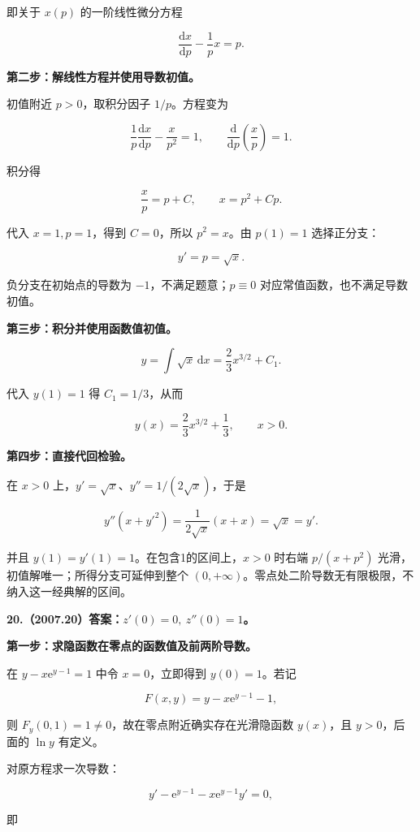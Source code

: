 \documentclass[UTF8,11pt,fontset=windows]{ctexart}
\begin{document}
即关于 $x(p)$ 的一阶线性微分方程

$$
\frac{\mathrm dx}{\mathrm dp}-\frac1p x=p.
$$

\textbf{第二步：解线性方程并使用导数初值。}

初值附近 $p>0$，取积分因子 $1/p$。方程变为

$$
\frac1p\frac{\mathrm dx}{\mathrm dp}-\frac{x}{p^2}=1,
\qquad
\frac{\mathrm d}{\mathrm dp}\left(\frac xp\right)=1.
$$

积分得

$$
\frac xp=p+C,\qquad x=p^2+Cp.
$$

代入 $x=1,p=1$，得到 $C=0$，所以 $p^2=x$。由 $p(1)=1$ 选择正分支：

$$
y'=p=\sqrt x.
$$

负分支在初始点的导数为 $-1$，不满足题意；$p\equiv0$ 对应常值函数，也不满足导数初值。

\textbf{第三步：积分并使用函数值初值。}

$$
y=\int\sqrt x\,\mathrm dx
=\frac23x^{3/2}+C_1.
$$

代入 $y(1)=1$ 得 $C_1=1/3$，从而

$$
\boxed{y(x)=\frac23x^{3/2}+\frac13,\qquad x>0.}
$$

\textbf{第四步：直接代回检验。}

在 $x>0$ 上，$y'=\sqrt x$、$y''=1/(2\sqrt x)$，于是

$$
y''(x+y'^2)=\frac1{2\sqrt x}(x+x)=\sqrt x=y'.
$$

并且 $y(1)=y'(1)=1$。在包含1的区间上，$x>0$ 时右端 $p/(x+p^2)$ 光滑，初值解唯一；所得分支可延伸到整个 $(0,+\infty)$。零点处二阶导数无有限极限，不纳入这一经典解的区间。

\clearpage

\textbf{20.（2007.20）答案：$z'(0)=0,\ z''(0)=1$。}

\textbf{第一步：求隐函数在零点的函数值及前两阶导数。}

在 $y-x\mathrm e^{y-1}=1$ 中令 $x=0$，立即得到 $y(0)=1$。若记

$$
F(x,y)=y-x\mathrm e^{y-1}-1,
$$

则 $F_y(0,1)=1\ne0$，故在零点附近确实存在光滑隐函数 $y(x)$，且 $y>0$，后面的 $\ln y$ 有定义。

对原方程求一次导数：

$$
y'-\mathrm e^{y-1}-x\mathrm e^{y-1}y'=0,
$$

即
\end{document}
